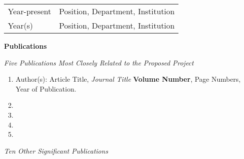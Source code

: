 
\begin{tabular}{ll}
Year-present & Position, Department, Institution \\
Year(s)      & Position, Department, Institution \\
\end{tabular}



\vspace{12pt}
{\bf  Publications}

\vspace{12pt}
\emph{Five Publications Most Closely Related to the Proposed Project}

\begin{enumerate}
\item Author(s): Article Title, \emph{Journal Title} {\bf Volume Number}, Page Numbers, Year of Publication.

\item

\item

\item

\item
\end{enumerate}

\vspace{12pt}
\emph{Ten Other Significant Publications}

